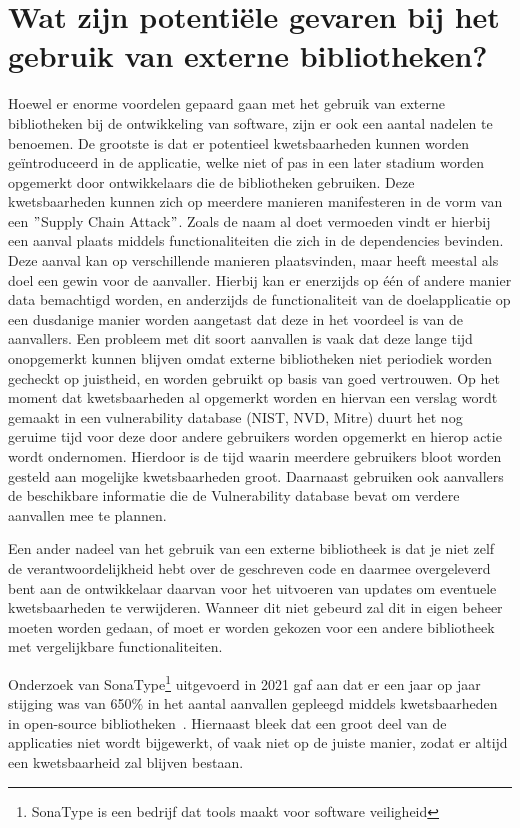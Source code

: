 \section{Wat zijn potentiële gevaren bij het gebruik van externe bibliotheken?} \label{sec:wat-zijn-potentieel-gevaren-die-het-gebruik-van-externe-bibliotheken?}
Hoewel er enorme voordelen gepaard gaan met het gebruik van externe bibliotheken bij de ontwikkeling van software, zijn er ook een aantal nadelen te benoemen. De grootste is dat er potentieel kwetsbaarheden kunnen worden geïntroduceerd in de applicatie, welke niet of pas in een later stadium worden opgemerkt door ontwikkelaars die de bibliotheken gebruiken. Deze kwetsbaarheden kunnen zich op meerdere manieren manifesteren in de vorm van een $"$Supply Chain Attack$"$. Zoals de naam al doet vermoeden vindt er hierbij een aanval plaats middels functionaliteiten die zich in de dependencies bevinden. Deze aanval kan op verschillende manieren plaatsvinden, maar heeft meestal als doel een gewin voor de aanvaller. Hierbij kan er enerzijds op één of andere manier data bemachtigd worden, en anderzijds de functionaliteit van de doelapplicatie op een dusdanige manier worden aangetast dat deze in het voordeel is van de aanvallers. Een probleem met dit soort aanvallen is vaak dat deze lange tijd onopgemerkt kunnen blijven omdat externe bibliotheken niet periodiek worden gecheckt op juistheid, en worden gebruikt op basis van goed vertrouwen. Op het moment dat kwetsbaarheden al opgemerkt worden en hiervan een verslag wordt gemaakt in een vulnerability database (NIST, NVD, Mitre) duurt het nog geruime tijd voor deze door andere gebruikers worden opgemerkt en hierop actie wordt ondernomen. Hierdoor is de tijd waarin meerdere gebruikers bloot worden gesteld aan mogelijke kwetsbaarheden groot. Daarnaast gebruiken ook aanvallers de beschikbare informatie die de Vulnerability database bevat om verdere aanvallen mee te plannen.

Een ander nadeel van het gebruik van een externe bibliotheek is dat je niet zelf de verantwoordelijkheid hebt over de geschreven code en daarmee overgeleverd bent aan de ontwikkelaar daarvan voor het uitvoeren van updates om eventuele kwetsbaarheden te verwijderen. Wanneer dit niet gebeurd zal dit in eigen beheer moeten worden gedaan, of moet er worden gekozen voor een andere bibliotheek met vergelijkbare functionaliteiten.

Onderzoek van SonaType\footnote{SonaType is een bedrijf dat tools maakt voor software veiligheid} uitgevoerd in 2021 gaf aan dat er een jaar op jaar stijging was van 650\% in het aantal aanvallen gepleegd middels kwetsbaarheden in open-source bibliotheken~\citep{Sonatype:2021}.
Hiernaast bleek dat een groot deel van de applicaties niet wordt bijgewerkt, of vaak niet op de juiste manier, zodat er altijd een kwetsbaarheid zal blijven bestaan.

